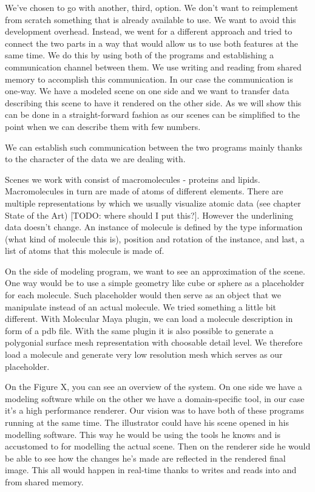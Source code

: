 \documentclass[
  digital, %
  table,   %
  nolof,     %
  nolot,     %
]{fithesis3}
\begin{document}
We've chosen to go with another, third, option. We don't want to reimplement from scratch something that is already available to use. We want to avoid this development overhead. Instead, we went for a different approach and tried to connect the two parts in a way that would allow us to use both features at the same time. We do this by using both of the programs and establishing a communication channel between them. We use writing and reading from shared memory to accomplish this communication. In our case the communication is one-way. We have a modeled scene on one side and we want to transfer data describing this scene to have it rendered on the other side. As we will show this can be done in a straight-forward fashion as our scenes can be simplified to the point when we can describe them with few numbers.

We can establish such communication between the two programs mainly thanks to the character of the data we are dealing with.

Scenes we work with consist of macromolecules - proteins and lipids. Macromolecules in turn are made of atoms of different elements. There are multiple representations by which we usually visualize atomic data (see chapter State of the Art) [TODO: where should I put this?]. However the underlining data doesn't change. An instance of molecule is defined by the type information (what kind of molecule this is), position and rotation of the instance, and last, a list of atoms that this molecule is made of.

On the side of modeling program, we want to see an approximation of the scene. One way would be to use a simple geometry like cube or sphere as a placeholder for each molecule. Such placeholder would then serve as an object that we manipulate instead of an actual molecule. We tried something a little bit different. With Molecular Maya plugin, we can load a molecule description in form of a pdb file. With the same plugin it is also possible to generate a polygonial surface mesh representation with choosable detail level. We therefore load a molecule and generate very low resolution mesh which serves as our placeholder.

On the Figure X, you can see an overview of the system. On one side we have a modeling software while on the other we have a domain-specific tool, in our case it's a high performance renderer. Our vision was to have both of these programs running at the same time. The illustrator could have his scene opened in his modelling software. This way he would be using the tools he knows and is accustomed to for modelling the actual scene. Then on the renderer side he would be able to see how the changes he's made are reflected in the rendered final image. This all would happen in real-time thanks to writes and reads into and from shared memory.
\end{document}
